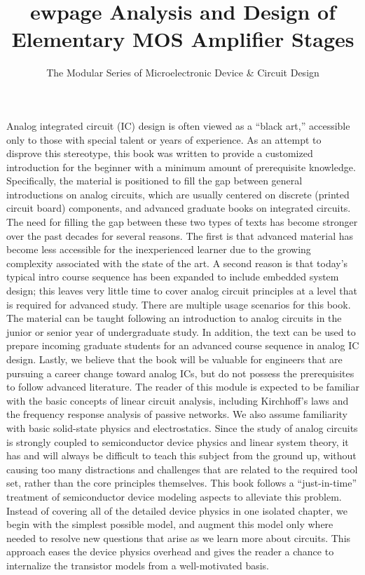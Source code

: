 \documentclass[
  11pt,
  letterpaper,
  abstract]{scrbook}
\title{ewpage Analysis and Design of Elementary MOS Amplifier Stages}
\subtitle{The Modular Series of Microelectronic Device \& Circuit
Design}
\author{}
\date{}
\newenvironment{abstract}{%
    \chapter*{\abstractname}%
    \addcontentsline{toc}{chapter}{\abstractname}%
    \small
}{%
    \clearpage
}
\begin{document}
\frontmatter
\maketitle
\begin{abstract}
Analog integrated circuit (IC) design is often viewed as a ``black
art,'' accessible only to those with special talent or years of
experience. As an attempt to disprove this stereotype, this book was
written to provide a customized introduction for the beginner with a
minimum amount of prerequisite knowledge. Specifically, the material is
positioned to fill the gap between general introductions on analog
circuits, which are usually centered on discrete (printed circuit board)
components, and advanced graduate books on integrated circuits. The need
for filling the gap between these two types of texts has become stronger
over the past decades for several reasons. The first is that advanced
material has become less accessible for the inexperienced learner due to
the growing complexity associated with the state of the art. A second
reason is that today's typical intro course sequence has been expanded
to include embedded system design; this leaves very little time to cover
analog circuit principles at a level that is required for advanced
study. There are multiple usage scenarios for this book. The material
can be taught following an introduction to analog circuits in the junior
or senior year of undergraduate study. In addition, the text can be used
to prepare incoming graduate students for an advanced course sequence in
analog IC design. Lastly, we believe that the book will be valuable for
engineers that are pursuing a career change toward analog ICs, but do
not possess the prerequisites to follow advanced literature. The reader
of this module is expected to be familiar with the basic concepts of
linear circuit analysis, including Kirchhoff's laws and the frequency
response analysis of passive networks. We also assume familiarity with
basic solid-state physics and electrostatics. Since the study of analog
circuits is strongly coupled to semiconductor device physics and linear
system theory, it has and will always be difficult to teach this subject
from the ground up, without causing too many distractions and challenges
that are related to the required tool set, rather than the core
principles themselves. This book follows a ``just-in-time'' treatment of
semiconductor device modeling aspects to alleviate this problem. Instead
of covering all of the detailed device physics in one isolated chapter,
we begin with the simplest possible model, and augment this model only
where needed to resolve new questions that arise as we learn more about
circuits. This approach eases the device physics overhead and gives the
reader a chance to internalize the transistor models from a
well-motivated basis.
\end{abstract}
\end{document}
